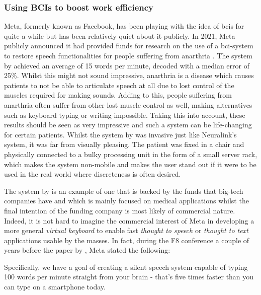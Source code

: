 
\subsubsection{Using BCIs to boost work efficiency}
\label{subsubsec:bci_gaining_popularity_big_tech_efficiency}

Meta, formerly known as Facebook, has been playing with the idea of \glspl{bci} for quite a while but has been relatively quiet about it publicly.
In 2021, Meta publicly announced it had provided funds for research on the use of a \gls{bci}-system to restore speech functionalities for people suffering from anarthria \citep{facebook_bci_keyboard, facebook_bci_blog}.
The system by \citet{facebook_bci_keyboard} achieved an average of 15 words per minute, decoded with a median error of 25\%.
Whilst this might not sound impressive, anarthria is a disease which causes patients to not be able to articulate speech at all due to lost control of the muscles required for making sounds.
Adding to this, people suffering from anarthria often suffer from other lost muscle control as well, making alternatives such as keyboard typing or writing impossible.
Taking this into account, these results should be seen as very impressive and such a system can be life-changing for certain patients.
Whilst the system by \citet{facebook_bci_keyboard} was invasive just like Neuralink's system, it was far from visually pleasing.
The patient was fixed in a chair and physically connected to a bulky processing unit in the form of a small server rack, which makes the system non-mobile and makes the user stand out if it were to be used in the real world where discreteness is often desired.

The system by \citet{facebook_bci_keyboard} is an example of one that is backed by the funds that big-tech companies have and which is mainly focused on medical applications whilst the final intention of the funding company is most likely of commercial nature.
Indeed, it is not hard to imagine the commercial interest of Meta in developing a more general \textit{virtual keyboard} to enable fast \textit{thought to speech} or \textit{thought to text} applications usable by the masses.
In fact, during the F8 conference \citep{fb_building8} a couple of years before the paper by \citet{facebook_bci_keyboard}, Meta stated the following:


\setlength{\epigraphwidth}{0.9\textwidth}
\epigraph{Specifically, we have a goal of creating a silent speech system capable of typing 100 words per minute straight from your brain - that's five times faster than you can type on a smartphone today.}{\textit{\citet{fb_building8}}}


